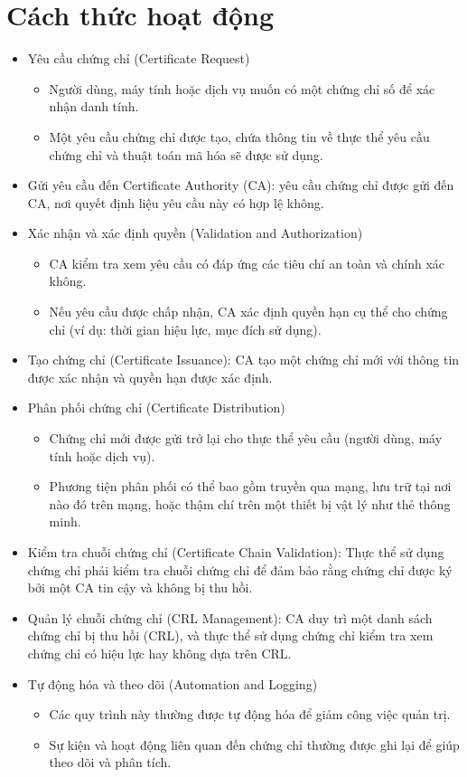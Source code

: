 \documentclass[13pt]{report}
\begin{document}
	\section{Cách thức hoạt động}
	\begin{itemize}
		\item Yêu cầu chứng chỉ (Certificate Request)
		\begin{itemize}
			\item Người dùng, máy tính hoặc dịch vụ muốn có một chứng chỉ số để xác nhận danh tính.
			\item Một yêu cầu chứng chỉ được tạo, chứa thông tin về thực thể yêu cầu chứng chỉ và thuật toán mã hóa sẽ được sử dụng.
		\end{itemize}	
		\item Gửi yêu cầu đến Certificate Authority (CA): yêu cầu chứng chỉ được gửi đến CA, nơi quyết định liệu yêu cầu này có hợp lệ không.
		\item Xác nhận và xác định quyền (Validation and Authorization)
		\begin{itemize}
			\item CA kiểm tra xem yêu cầu có đáp ứng các tiêu chí an toàn và chính xác không.
			\item Nếu yêu cầu được chấp nhận, CA xác định quyền hạn cụ thể cho chứng chỉ (ví dụ: thời gian hiệu lực, mục đích sử dụng).
		\end{itemize}	
		\item Tạo chứng chỉ (Certificate Issuance): CA tạo một chứng chỉ mới với thông tin được xác nhận và quyền hạn được xác định.
		\item Phân phối chứng chỉ (Certificate Distribution)
		\begin{itemize}
			\item Chứng chỉ mới được gửi trở lại cho thực thể yêu cầu (người dùng, máy tính hoặc dịch vụ).
			\item Phương tiện phân phối có thể bao gồm truyền qua mạng, lưu trữ tại nơi nào đó trên mạng, hoặc thậm chí trên một thiết bị vật lý như thẻ thông minh.
		\end{itemize}	
		\item Kiểm tra chuỗi chứng chỉ (Certificate Chain Validation): Thực thể sử dụng chứng chỉ phải kiểm tra chuỗi chứng chỉ để đảm bảo rằng chứng chỉ được ký bởi một CA tin cậy và không bị thu hồi.
		\item Quản lý chuỗi chứng chỉ (CRL Management): CA duy trì một danh sách chứng chỉ bị thu hồi (CRL), và thực thể sử dụng chứng chỉ kiểm tra xem chứng chỉ có hiệu lực hay không dựa trên CRL.
		\item Tự động hóa và theo dõi (Automation and Logging)
		\begin{itemize}
			\item Các quy trình này thường được tự động hóa để giảm công việc quản trị.
			\item Sự kiện và hoạt động liên quan đến chứng chỉ thường được ghi lại để giúp theo dõi và phân tích.
		\end{itemize}	
	\end{itemize}
\end{document}
